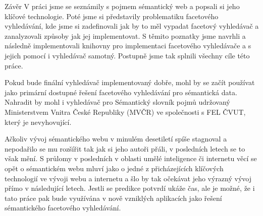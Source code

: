 \chap Závěr
V práci jsme se seznámily s pojmem sémantický web a popsali si jeho klíčové technologie. 
Poté jsme si představily problematiku facetového vyhledávání, kde jsme si zadefinovali jak by to měl vypadat facetový vyhledávač a zanalyzovali způsoby jak jej implementovat.
S těmito poznatky jsme navrhli a následně implementovali knihovny pro implementaci facetového vyhledávače a s jejich pomocí i vyhledávač samotný.
Postupně jsme tak splnili všechny cíle této práce.

Pokud bude finální vyhledávač implementovaný dobře, mohl by se začít používat jako primární dostupné řešení facetového vyhledávání pro sémantická data.
Nahradit by mohl i vyhledávač pro Sémantický slovník pojmů udržovaný Ministerstvem Vnitra České Republiky (MVČR) ve společnosti s FEL ČVUT, který je nevyhovující.

Ačkoliv vývoj sémantického webu v minulém desetiletí spíše stagnoval a nepodařilo se mu rozšířit tak jak si jeho autoři přáli, v posledních letech se to však mění.
S průlomy v posledních v oblasti umělé inteligence či internetu věcí se opět o sémantickém webu mluví jako o jedné z přicházejících klíčových technologií ve vývoji webu a internetu a šlo by tak očekávat jeho výrazný vývoj přímo v následující letech.
Jestli se predikce potvrdí ukáže čas, ale je možné, že i tato práce pak bude využívána v nově vzniklých aplikacích jako řešení sémantického facetového vyhledávání.
